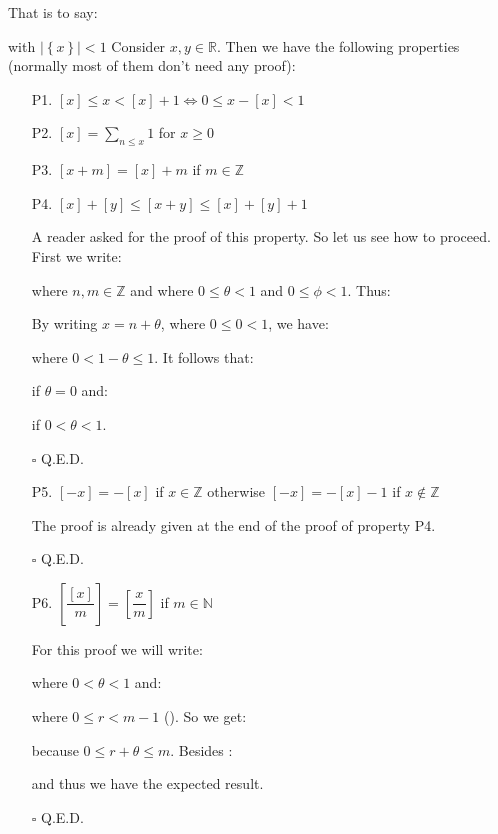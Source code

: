 That is to say:
	
with $\mid \left\lbrace x\right\rbrace \mid < 1$
Consider $x,y \in \mathbb{R}$. Then we have the following properties (normally most of them don't need any proof):
	\begin{enumerate}
		\item[P1.] $[x]\leq x <[x]+1\Leftrightarrow 0\leq x-[x] <1$
		\item[P2.] $[x]=\displaystyle\sum_{n\leq x} 1$ for $x \geq 0$
		\item[P3.] $[x+m]=[x]+m$ if $m \in \mathbb{Z}$
		\item[P4.] $[x]+[y] \leq [x+y] \leq [x]+[y]+1$
		\begin{dem}
			A reader asked for the proof of this property. So let us see how to proceed. First we write:
			
		where $n,m \in \mathbb{Z}$ and where $0 \leq \theta < 1$ and $0 \leq \phi <1$. Thus:
			
			By writing $x=n+\theta$, where $0\leq 0 <1$, we have:
			
			where $0 < 1 -\theta \leq 1$.
			It follows that:
			
			if $\theta = 0$ and:
			
			if $0<\theta<1$.
			\begin{flushright}
				$\square$  Q.E.D.
			\end{flushright}
		\end{dem}
		\item[P5.] $[-x]=-[x]$ if $x \in \mathbb{Z}$ otherwise $[-x]=-[x]-1$ if $x \not\in \mathbb{Z}$
			\begin{dem}
			 The proof is already given at the end of the proof of property P4.
			\begin{flushright}
				$\square$  Q.E.D.
			\end{flushright}		
			\end{dem}
		\item[P6.] $\left[\dfrac{[x]}{m}\right]=\left[\dfrac{x}{m}\right]$ if $m \in \mathbb{N}$ 
			\begin{dem}
				For this proof we will write:
				
				where $0 < \theta <1$
				and:
				
			where $0 \leq r < m-1$ (). So we get:
				
				because $0 \leq r + \theta \leq m$. Besides :
				
				and thus we have the expected result.
				\begin{flushright}
					$\square$  Q.E.D.
				\end{flushright}
			\end{dem}


\end{enumerate}
